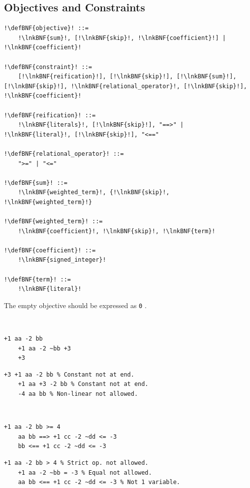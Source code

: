 \documentclass[a4paper]{article}
\newcommand{\defBNF}[1]{\hypertarget{def:#1}{<\detokenize{#1}>}}
\newcommand{\lnkBNF}[1]{\hyperlink{def:#1}{<\detokenize{#1}>}}
\begin{document}
\subsection{Objectives and Constraints}\label{sec:constraints}
\begin{lstlisting}
!\defBNF{objective}! ::=
	!\lnkBNF{sum}!, [!\lnkBNF{skip}!, !\lnkBNF{coefficient}!] | !\lnkBNF{coefficient}!

!\defBNF{constraint}! ::=
	[!\lnkBNF{reification}!], [!\lnkBNF{skip}!], [!\lnkBNF{sum}!], [!\lnkBNF{skip}!], !\lnkBNF{relational_operator}!, [!\lnkBNF{skip}!], !\lnkBNF{coefficient}!

!\defBNF{reification}! ::=
	!\lnkBNF{literals}!, [!\lnkBNF{skip}!], "==>" | !\lnkBNF{literal}!, [!\lnkBNF{skip}!], "<=="

!\defBNF{relational_operator}! ::=
	">=" | "<="

!\defBNF{sum}! ::=
	!\lnkBNF{weighted_term}!, {!\lnkBNF{skip}!, !\lnkBNF{weighted_term}!}

!\defBNF{weighted_term}! ::=
	!\lnkBNF{coefficient}!, !\lnkBNF{skip}!, !\lnkBNF{term}!

!\defBNF{coefficient}! ::=
	!\lnkBNF{signed_integer}!

!\defBNF{term}! ::=
	!\lnkBNF{literal}!
\end{lstlisting}
The empty objective should be expressed as \verb!0! .

~\\
\begin{minipage}{.49\linewidth}
	\begin{lstlisting}[language=veripb, gobble=4, rulecolor=\color{veripb-valid-text}, caption={Syntactically correct objectives.}]
	+1 aa -2 bb
	+1 aa -2 ~bb +3
	+3
	\end{lstlisting}
\end{minipage}\hfill%
\begin{minipage}{.49\linewidth}
	\begin{lstlisting}[language=veripb, gobble=4, rulecolor=\color{veripb-invalid-text}, caption={Syntactically incorrect objectives.}]
	+3 +1 aa -2 bb % Constant not at end.
	+1 aa +3 -2 bb % Constant not at end.
	-4 aa bb % Non-linear not allowed.
	\end{lstlisting}
\end{minipage}
\\
\begin{minipage}{.49\linewidth}
	\begin{lstlisting}[language=veripb, gobble=4, rulecolor=\color{veripb-valid-text}, caption={Syntactically correct constraints.}]
	+1 aa -2 bb >= 4
	aa bb ==> +1 cc -2 ~dd <= -3
	bb <== +1 cc -2 ~dd <= -3
	\end{lstlisting}
\end{minipage}\hfill%
\begin{minipage}{.49\linewidth}
	\begin{lstlisting}[language=veripb, gobble=4, rulecolor=\color{veripb-invalid-text}, caption={Syntactically incorrect constraints.}]
	+1 aa -2 bb > 4 % Strict op. not allowed.
	+1 aa -2 ~bb = -3 % Equal not allowed.
	aa bb <== +1 cc -2 ~dd <= -3 % Not 1 variable.
	\end{lstlisting}
\end{minipage}
\end{document}
